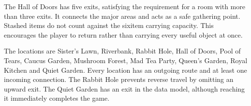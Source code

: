 \documentclass[letterpaper,10pt,english]{sphinxmanual}
\begin{document}
\begin{sphinxVerbatim}[commandchars=\\\{\}]
                  
                 \PYG{p}{[}\PYG{p}{]}
                       \PYGZbs{} 
                                      
              
                         
                                      
        
                      

            \PYG{p}{[}\PYG{p}{]}
\end{sphinxVerbatim}

\sphinxAtStartPar
The Hall of Doors has five exits, satisfying the requirement for a room with
more than three exits. It connects the major areas and acts as a safe gathering
point. Stashed items do not count against the six\sphinxhyphen{}item carrying capacity. This
encourages the player to return rather than carrying every useful object at
once.

\sphinxAtStartPar
The locations are Sister’s Lawn, Riverbank, Rabbit Hole, Hall of Doors, Pool of
Tears, Caucus Garden, Mushroom Forest, Mad Tea Party, Queen’s Garden, Royal
Kitchen and Quiet Garden. Every location has an outgoing route and at least one
incoming connection. The Rabbit Hole prevents reverse travel by omitting an
upward exit. The Quiet Garden has an exit in the data model, although reaching
it immediately completes the game.
\end{document}
